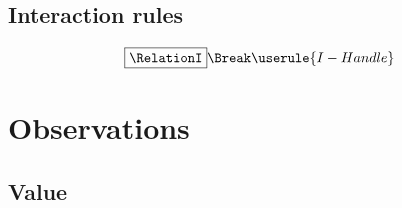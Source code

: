 \subsection{Interaction rules}

\begin{gather*}
  \boxed{\RelationI} \Break
  \userule{I-Handle}
\end{gather*}


\section{Observations}

\subsection{Value}



\endinput



\subsection{Failing}

\usemacro{O-Failing}


\subsection{Watching}

\usemacro{O-Watching}


\subsection{Picks and Inputs}

\usemacro{O-Picks}

\usemacro{O-Inputs}


